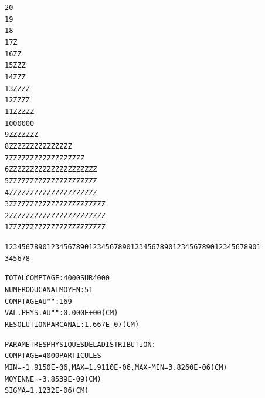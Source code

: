 \begin{tiny}
\begin{center}
\begin{alltt}
   20                                                                                      
   19                                                                                      
   18                                                                                      
   17                                                                Z                     
   16                                              Z                 Z                     
   15                                              ZZ                Z                     
   14                                              ZZ                Z                     
   13                                              ZZ               ZZ                     
   12                                              ZZ               ZZ                     
   11                                              ZZ              ZZZ                     
   10                                              00              000                     
    9                                              ZZZZ            ZZZ                     
    8                                             ZZZZZZZ Z Z   ZZZZZZ                     
    7                                             ZZZZZZZ Z Z ZZZZZZZZZ                    
    6                                             ZZZZZZZZZZZZZZZZZZZZZ                    
    5                                             ZZZZZZZZZZZZZZZZZZZZZ                    
    4                                             ZZZZZZZZZZZZZZZZZZZZZ                    
    3                                            ZZZZZZZZZZZZZZZZZZZZZZZ                   
    2                                            ZZZZZZZZZZZZZZZZZZZZZZZ                   
    1                                            ZZZZZZZZZZZZZZZZZZZZZZZ                   

                              1234567890123456789012345678901234567890123456789012345678901
                                       3         4         5         6         7         8

                TOTAL  COMPTAGE                 :    4000  SUR   4000
                NUMERO   DU  CANAL  MOYEN       :      51
                COMPTAGE  AU   "      "         :     169
                VAL. PHYS. AU  "      "         :  0.000E+00 (CM) 
                RESOLUTION  PAR  CANAL          :  1.667E-07 (CM) 

                PARAMETRES  PHYSIQUES  DE  LA  DISTRIBUTION :
                              COMPTAGE =   4000  PARTICULES
                              MIN = -1.9150E-06, MAX =  1.9110E-06, MAX-MIN =  3.8260E-06 (CM) 
                              MOYENNE = -3.8539E-09 (CM) 
                              SIGMA =  1.1232E-06 (CM) 


\end{alltt}
\end{center}
\end{tiny}
